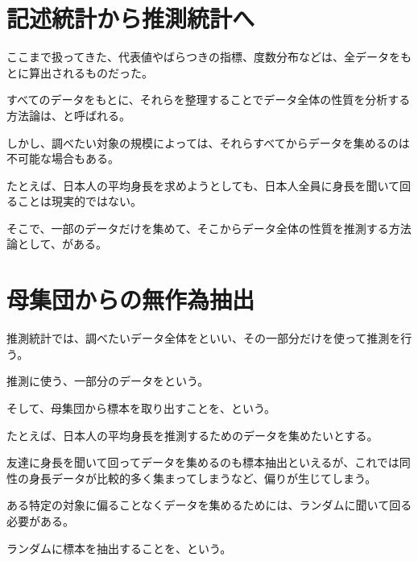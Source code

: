 \documentclass[../../../topic_statistics]{subfiles}
\begin{document}
\sectionline
\section{記述統計から推測統計へ}

ここまで扱ってきた、代表値やばらつきの指標、度数分布などは、全データをもとに算出されるものだった。

すべてのデータをもとに、それらを整理することでデータ全体の性質を分析する方法論は、と呼ばれる。

\br

しかし、調べたい対象の規模によっては、それらすべてからデータを集めるのは不可能な場合もある。

たとえば、日本人の平均身長を求めようとしても、日本人全員に身長を聞いて回ることは現実的ではない。

\br

そこで、一部のデータだけを集めて、そこからデータ全体の性質を推測する方法論として、がある。

\sectionline
\section{母集団からの無作為抽出}

推測統計では、調べたいデータ全体をといい、その一部分だけを使って推測を行う。

推測に使う、一部分のデータをという。

\br

そして、母集団から標本を取り出すことを、という。

\br

たとえば、日本人の平均身長を推測するためのデータを集めたいとする。

友達に身長を聞いて回ってデータを集めるのも標本抽出といえるが、これでは同性の身長データが比較的多く集まってしまうなど、偏りが生じてしまう。

\br

ある特定の対象に偏ることなくデータを集めるためには、ランダムに聞いて回る必要がある。

ランダムに標本を抽出することを、という。
\end{document}
